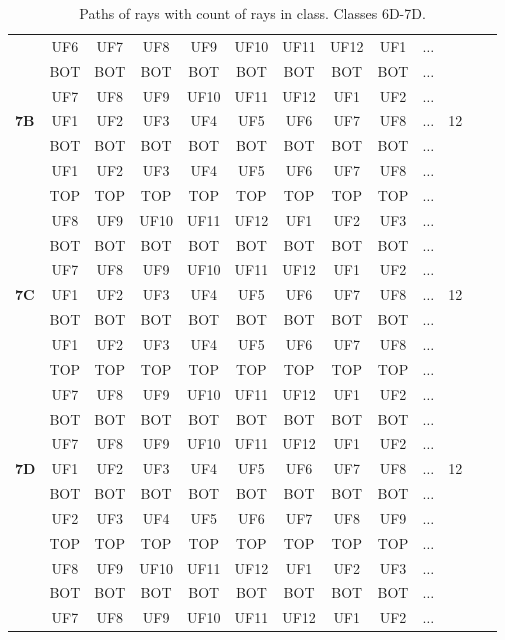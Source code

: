 \begin{table}[h!]
\begin{tabular}{|l|c|c|c|c|c|c|c|c|c|c|c|c|}
 & UF6 & UF7 & UF8 & UF9 & UF10 & UF11 & UF12 & UF1 & $\dots$ & \\
 & BOT & BOT & BOT & BOT & BOT & BOT & BOT & BOT & $\dots$ & \\
 & UF7 & UF8 & UF9 & UF10 & UF11 & UF12 & UF1 & UF2 & $\dots$ & \\
\hline \hline
\textbf{7B} & UF1 & UF2 & UF3 & UF4 & UF5 & UF6 & UF7 & UF8 & $\dots$ & 12\\
 & BOT & BOT & BOT & BOT & BOT & BOT & BOT & BOT & $\dots$ & \\
 & UF1 & UF2 & UF3 & UF4 & UF5 & UF6 & UF7 & UF8 & $\dots$ & \\
 & TOP & TOP & TOP & TOP & TOP & TOP & TOP & TOP & $\dots$ & \\
 & UF8 & UF9 & UF10 & UF11 & UF12 & UF1 & UF2 & UF3 & $\dots$ & \\
 & BOT & BOT & BOT & BOT & BOT & BOT & BOT & BOT & $\dots$ & \\
 & UF7 & UF8 & UF9 & UF10 & UF11 & UF12 & UF1 & UF2 & $\dots$ & \\
\hline \hline
\textbf{7C} & UF1 & UF2 & UF3 & UF4 & UF5 & UF6 & UF7 & UF8 & $\dots$ & 12\\
 & BOT & BOT & BOT & BOT & BOT & BOT & BOT & BOT & $\dots$ & \\
 & UF1 & UF2 & UF3 & UF4 & UF5 & UF6 & UF7 & UF8 & $\dots$ & \\
 & TOP & TOP & TOP & TOP & TOP & TOP & TOP & TOP & $\dots$ & \\
 & UF7 & UF8 & UF9 & UF10 & UF11 & UF12 & UF1 & UF2 & $\dots$ & \\
 & BOT & BOT & BOT & BOT & BOT & BOT & BOT & BOT & $\dots$ & \\
 & UF7 & UF8 & UF9 & UF10 & UF11 & UF12 & UF1 & UF2 & $\dots$ & \\
\hline \hline
\textbf{7D} & UF1 & UF2 & UF3 & UF4 & UF5 & UF6 & UF7 & UF8 & $\dots$ & 12\\
 & BOT & BOT & BOT & BOT & BOT & BOT & BOT & BOT & $\dots$ & \\
 & UF2 & UF3 & UF4 & UF5 & UF6 & UF7 & UF8 & UF9 & $\dots$ & \\
 & TOP & TOP & TOP & TOP & TOP & TOP & TOP & TOP & $\dots$ & \\
 & UF8 & UF9 & UF10 & UF11 & UF12 & UF1 & UF2 & UF3 & $\dots$ & \\
 & BOT & BOT & BOT & BOT & BOT & BOT & BOT & BOT & $\dots$ & \\
 & UF7 & UF8 & UF9 & UF10 & UF11 & UF12 & UF1 & UF2 & $\dots$ & \\
\hline 
\end{tabular}
\caption{Paths of rays with count of rays in class. Classes 6D-7D.}
\label{table:TableClasses2}
\end{table}

